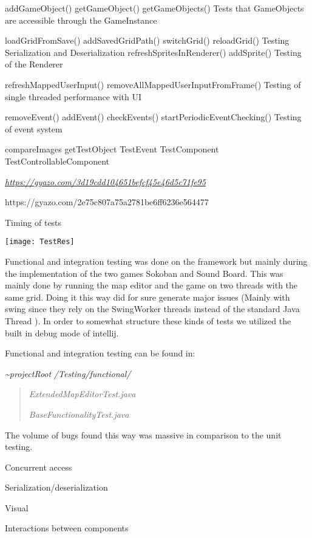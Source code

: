 \documentclass[]{article}
\begin{document}
addGameObject()
getGameObject()
getGameObjects()
Tests that GameObjects are accessible through the GameInstance

loadGridFromSave()
addSavedGridPath()
switchGrid()
reloadGrid()
Testing Serialization and Deserialization
refreshSpritesInRenderer()
addSprite()
Testing of the Renderer

refreshMappedUserInput()
removeAllMappedUserInputFromFrame()
Testing of single threaded performance with UI 


removeEvent()
addEvent()
checkEvents()
startPeriodicEventChecking()
Testing of event system

compareImages
getTestObject
TestEvent
TestComponent
TestControllableComponent

\href{https://gyazo.com/3d19cdd104651befcf45e46d5c71fe95}{\emph{https://gyazo.com/3d19cdd104651befcf45e46d5c71fe95}}

https://gyazo.com/2e75c807a75a2781be6ff6236e564477

Timing of tests\\
\begin{center}
\texttt{[image: TestRes]}
\end{center}

Functional and integration testing was done on the framework but mainly
during the implementation of the two games Sokoban and Sound Board. This
was mainly done by running the map editor and the game on two threads
with the same grid. Doing it this way did for sure generate major issues
(Mainly with swing since they rely on the SwingWorker threads instead of
the standard Java Thread ). In order to somewhat structure these kinds
of tests we utilized the built in debug mode of intellij.

Functional and integration testing can be found in:

\emph{\textasciitilde{}projectRoot} \emph{/Testing/functional/ }

\begin{quote}
\emph{ExtendedMapEditorTest.java}

\emph{BaseFunctionalityTest.java}
\end{quote}

The volume of bugs found this way was massive in comparison to the unit
testing.

Concurrent access

Serialization/deserialization

Visual

Interactions between components
\end{document}
